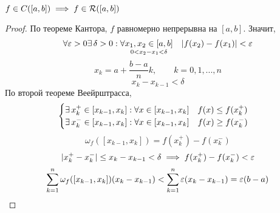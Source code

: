 \begin{props}
	\item $ f \in C([a, b]) \implies f \in \mathcal{R}([a, b]) $
	\begin{proof}
		По теореме Кантора, $f$ равномерно непрерывна на $ [a, b] $. Значит,
		$$ \forall \varepsilon > 0 \exists\, \delta > 0 : \forall \underset{0 < x_2 - x_1 < \delta}{x_1, x_2 \in [a, b]} \quad |f(x_2) - f(x_1) | < \varepsilon $$
		$$ x_k = a + \frac{b - a}nk, \qquad k = 0, 1, ..., n $$
		$$ x_k - x_{k - 1} < \delta $$
		По второй теореме Веейрштрасса,
		$$
		\begin{cases}
			\exists\, x_k^+ \in [x_{k - 1}, x_k] : \forall x \in [x_{k - 1}, x_k] \quad f(x) \le f(x_k^+) \\
			\exists\, x_k^- \in [x_{k - 1}, x_k] : \forall x \in [x_{k - 1}, x_k] \quad f(x) \ge f(x_k^-)
		\end{cases} $$
		$$ \omega_f([x_{k - 1}, x_k]) = f(x_k^+) - f(x_k^-) $$
		$$ |x_k^+ - x_k^- | \le x_k - x_{k - 1} < \delta \implies f(x_k^+) - f(x_k^-) < \varepsilon $$
		$$ \sum_{k = 1}^n \omega_f([x_{k - 1}, x_k])(x_k - x_{k - 1}) < \sum_{k = 1}^n \varepsilon(x_k - x_{k - 1}) = \varepsilon(b - a) $$


	\end{proof}

\end{props}
